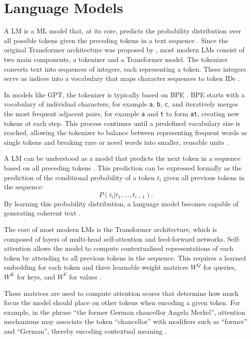 \documentclass[a4paper,oneside,bibliography=totoc]{scrbook}
\begin{document}
\section{Language Models}
\label{sec:language_models}

A \ac{LM} is a \ac{ML} model that, at its core, predicts the probability distribution over all possible tokens given the preceding tokens in a text sequence \cite{Radford2019}. Since the original Transformer architecture was proposed by \citet{Vaswani2023}, most modern \acp{LM} consist of two main components, a tokenizer and a Transformer model. The tokenizer converts text into sequences of integers, each representing a token. These integers serve as indices into a vocabulary that maps character sequences to token IDs \cite{Sennrich2016}.

In models like GPT, the tokenizer is typically based on \ac{BPE} \cite{Radford2019}. \Ac{BPE} starts with a vocabulary of individual characters, for example \texttt{a}, \texttt{b}, \texttt{c}, and iteratively merges the most frequent adjacent pairs, for example \texttt{a} and \texttt{t} to form \texttt{at}, creating new tokens at each step. This process continues until a predefined vocabulary size is reached, allowing the tokenizer to balance between representing frequent words as single tokens and breaking rare or novel words into smaller, reusable units \cite{Sennrich2016}.

A \ac{LM} can be understood as a model that predicts the next token in a sequence based on all preceding tokens \cite{Radford2019}. This prediction can be expressed formally as the prediction of the conditional probability of a token $t_i$ given all previous tokens in the sequence:
\begin{equation}
  P(t_i|t_1, ..., t_{i-1}).
\end{equation}
By learning this probability distribution, a language model becomes capable of generating coherent text \cite{Radford2019,Brown2020}.

The core of most modern \acp{LM} is the Transformer architecture, which is composed of layers of multi-head self-attention and feed-forward networks. Self-attention allows the model to compute contextualised representations of each token by attending to all previous tokens in the sequence. This requires a learned embedding for each token and three learnable weight matrices $W^Q$ for queries, $W^K$ for keys, and $W^V$ for values \cite{Vaswani2023}.

These matrices are used to compute attention scores that determine how much focus the model should place on other tokens when encoding a given token. For example, in the phrase \enquote{the former German chancellor Angela Merkel}, attention mechanisms may associate the token \enquote{chancellor} with modifiers such as \enquote{former} and \enquote{German}, thereby encoding contextual meaning \cite{Sanderson2024}.
\end{document}
